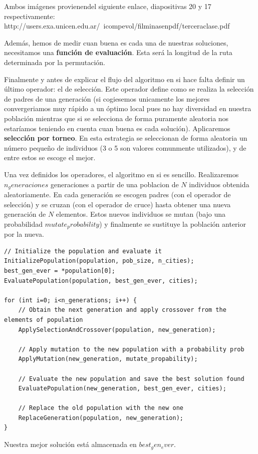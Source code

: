 \documentclass{article}
\begin{document}
Ambos imágenes provienendel siguiente enlace, diapositivas 20 y 17 respectivamente:
http://users.exa.unicen.edu.ar/~icompevol/filminasenpdf/terceraclase.pdf

Además, hemos de medir cuan buena es cada una de nuestras soluciones, necesitamos una \textbf{función de evaluación}. Esta será la longitud de la ruta determinada por la permutación.

Finalmente y antes de explicar el flujo del algoritmo en si hace falta definir un último operador: el de selección. Este operador define como se realiza la selección de padres de una generación (si cogiesemos unicamente los mejores convergeriamos muy rápido a un óptimo local pues no hay diversidad en nuestra población mientras que si se selecciona de forma puramente aleatoria nos estaríamos teniendo en cuenta cuan buena es cada solución). Aplicaremos \textbf{selección por torneo}. En esta estrategia se seleccionan de forma aleatoria un número pequeño de individuos (3 o 5 son valores comunmente utilizados), y de entre estos se escoge el mejor.

Una vez definidos los operadores, el algoritmo en si es sencillo. Realizaremos $n_generaciones$ generaciones a partir de una poblacion de $N$ individuos obtenida aleatoriamente. En cada generación se escogen padres (con el operador de selección) y se cruzan (con el operador de cruce) hasta obtener una nueva generación de $N$ elementos. Estos nuevos individuos se mutan (bajo una probabilidad $mutate_probability$) y finalmente se sustituye la población anterior por la nueva.

\begin{verbatim}
// Initialize the population and evaluate it
InitializePopulation(population, pob_size, n_cities);
best_gen_ever = *population[0];
EvaluatePopulation(population, best_gen_ever, cities);

for (int i=0; i<n_generations; i++) {
	// Obtain the next generation and apply crossover from the elements of population
	ApplySelectionAndCrossover(population, new_generation);
	
	// Apply mutation to the new population with a probability prob
	ApplyMutation(new_generation, mutate_propability);
	
	// Evaluate the new population and save the best solution found
	EvaluatePopulation(new_generation, best_gen_ever, cities);
	
	// Replace the old population with the new one
	ReplaceGeneration(population, new_generation);
}
\end{verbatim}

Nuestra mejor solución está almacenada en $best_gen_ever$.
\end{document}
